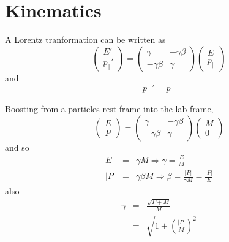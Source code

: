
\chapter{Kinematics}
A Lorentz tranformation can be written as
\begin{equation}
\left(\begin{array}{c} E' \\ p_{\parallel}' \end{array} \right)
=
\left(
\begin{array}{cc}
\gamma & -\gamma\beta \\
-\gamma\beta & \gamma
\end{array}
\right)
\left (\begin{array}{c} E \\ p_{\parallel} \end{array}\right)
\end{equation}
and
\begin{equation}
p_{\perp}' = p_{\perp}
\end{equation}

Boosting from a particles rest frame into the lab frame,
\begin{equation}
\left(\begin{array}{c} E \\ P \end{array} \right)
=
\left(
\begin{array}{cc}
\gamma & -\gamma\beta \\
-\gamma\beta & \gamma
\end{array}
\right)
\left (\begin{array}{c} M \\ 0 \end{array}\right)
\end{equation}
and so
\begin{eqnarray*}
E &=& \gamma M  \Longrightarrow \gamma = \frac{E}{M} \\
|P| &=& \gamma\beta M \Longrightarrow \beta = \frac{|P|}{\gamma M} = \frac{|P|}{E}
\end{eqnarray*}
also
\begin{eqnarray*}
\gamma &=& \frac{\sqrt{P + M}}{M} \\
&=& \sqrt{1 +\left(\frac{|P|}{M}\right)^2}
\end{eqnarray*}
